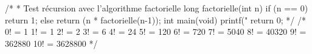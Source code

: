 /*
	* Test récursion avec l'algorithme factorielle
	long factorielle(int n) {
	  if (n == 0)
		return 1;
	  else
		return (n * factorielle(n-1));
	}
	int main(void) {
		printf("%
		return 0;
	}
*/
/*
	0! = 1
	1! = 1
	2! = 2
	3! = 6
	4! = 24
	5! = 120
	6! = 720
	7! = 5040
	8! = 40320
	9! = 362880
	10! = 3628800
*/
	\ELSE
	\FI
{}

